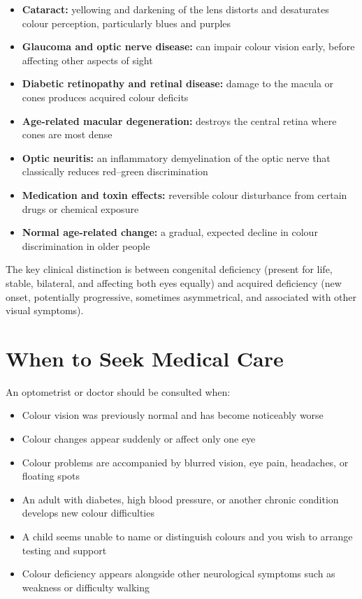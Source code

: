 \begin{itemize}
    \item \textbf{Cataract:} yellowing and darkening of the lens distorts and desaturates colour perception, particularly blues and purples
    \item \textbf{Glaucoma and optic nerve disease:} can impair colour vision early, before affecting other aspects of sight
    \item \textbf{Diabetic retinopathy and retinal disease:} damage to the macula or cones produces acquired colour deficits
    \item \textbf{Age-related macular degeneration:} destroys the central retina where cones are most dense
    \item \textbf{Optic neuritis:} an inflammatory demyelination of the optic nerve that classically reduces red--green discrimination
    \item \textbf{Medication and toxin effects:} reversible colour disturbance from certain drugs or chemical exposure
    \item \textbf{Normal age-related change:} a gradual, expected decline in colour discrimination in older people
\end{itemize}

The key clinical distinction is between congenital deficiency (present for life, stable, bilateral, and affecting both eyes equally) and acquired deficiency (new onset, potentially progressive, sometimes asymmetrical, and associated with other visual symptoms).

\section*{When to Seek Medical Care}
An optometrist or doctor should be consulted when:

\begin{itemize}
    \item Colour vision was previously normal and has become noticeably worse
    \item Colour changes appear suddenly or affect only one eye
    \item Colour problems are accompanied by blurred vision, eye pain, headaches, or floating spots
    \item An adult with diabetes, high blood pressure, or another chronic condition develops new colour difficulties
    \item A child seems unable to name or distinguish colours and you wish to arrange testing and support
    \item Colour deficiency appears alongside other neurological symptoms such as weakness or difficulty walking
\end{itemize}

